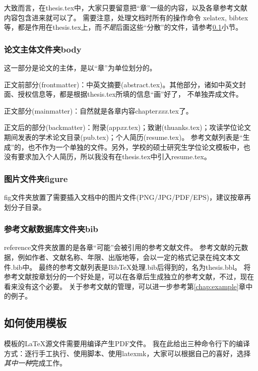 大致而言，在thesis.tex中，大家只要留意把``章''一级的内容，以及各章参考文献内容包含进来就可以了。
需要注意，处理文档时所有的操作命令 \cndash{}xelatex, bibtex等，都是作用在thesis.tex上，而\emph{不是}后面这些``分散''的文件，请参考\ref{sec:process}小节。

\subsubsection{论文主体文件夹body}
\label{sec:thesisbody}

这一部分是论文的主体，是以``章''为单位划分的。

正文前部分(frontmatter)：中英文摘要(abstract.tex)。其他部分，诸如中英文封面、授权信息等，都是根据thesis.tex所填的信息``画''好了，
不单独弄成文件。

正文部分(mainmatter)：自然就是各章内容chapter\emph{xxx}.tex了。

正文后的部分(backmatter)：附录(app\emph{xx}.tex)；致谢(thuanks.tex)；攻读学位论文期间发表的学术论文目录(pub.tex)；个人简历(resume.tex)。
参考文献列表是``生成''的，也不作为一个单独的文件。另外，学校的硕士研究生学位论文模板中，也没有要求加入个人简历，所以我没有在thesis.tex中引入resume.tex。

\subsubsection{图片文件夹figure}
\label{sec:fig}

fig文件夹放置了需要插入文档中的图片文件(PNG/JPG/PDF/EPS)，建议按章再划分子目录。

\subsubsection{参考文献数据库文件夹bib}
\label{sec:bib}

reference文件夹放置的是各章``可能''会被引用的参考文献文件。
参考文献的元数据，例如作者、文献名称、年限、出版地等，会以一定的格式记录在纯文本文件.bib中。
最终的参考文献列表是BibTeX处理.bib后得到的，名为thesis.bbl。
将参考文献按章划分的一个好处是，可以在各章后生成独立的参考文献，不过，现在看来没有这个必要。
关于参考文献的管理，可以进一步参考第\ref{chap:example}章中的例子。

\subsection{如何使用模板}
\label{sec:process}

模板的{\LaTeX}源文件需要用{\XeTeX}编译产生PDF文件。
我在此给出三种命令行下的编译方式：逐行手工执行、使用脚本、使用latexmk，大家可以根据自己的喜好，选择\emph{其中一种}完成工作。

